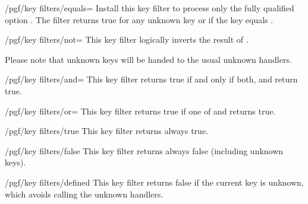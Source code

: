 \begin{key}{/pgf/key filters/equals=}
    Install this key filter to process only the fully qualified option
    . The filter returns true for any unknown key or if the key
    equals .
\begin{codeexample}[]
\end{codeexample}
\end{key}

\begin{key}{/pgf/key filters/not=}
    This key filter logically inverts the result of .
\begin{codeexample}[]
\end{codeexample}
    Please note that unknown keys will be handed to the usual unknown handlers.
\end{key}

\begin{key}{/pgf/key filters/and=}
    This key filter returns true if and only if both,  and
     return true.
\end{key}

\begin{key}{/pgf/key filters/or=}
    This key filter returns true if one of  and  returns true.
\end{key}

\begin{key}{/pgf/key filters/true}
    This key filter returns always true.
\end{key}

\begin{key}{/pgf/key filters/false}
    This key filter returns always false (including unknown keys).
\end{key}

\begin{key}{/pgf/key filters/defined}
    This key filter returns false if the current key is unknown, which avoids
    calling the unknown handlers.
\end{key}


